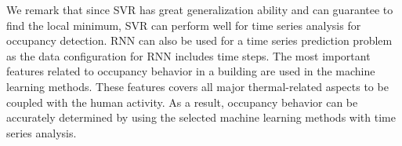 \textcolor{feb18rev}{We remark that since SVR has great
  generalization ability and can guarantee to find the local minimum,
  SVR can perform well for time series analysis for occupancy
  detection. RNN can also be used for a time series prediction problem
  as the data configuration for RNN includes time steps. The most
  important features related to occupancy behavior in a building are
  used in the machine learning methods. These features covers all
  major thermal-related aspects to be coupled with the human
  activity. As a result, occupancy behavior can be accurately
  determined by using the selected machine learning methods with time
  series analysis.}

